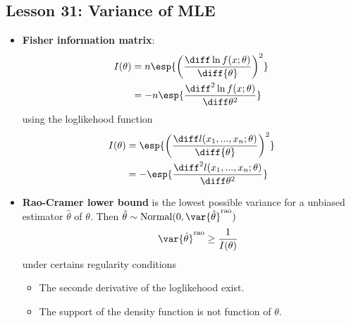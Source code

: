 \documentclass[10pt, french]{article}
\begin{document}
\begin{multicols*}{3}
\section*{Lesson 31: Variance of MLE}
\begin{itemize}[align=left,leftmargin=*]
    \item \textbf{Fisher information matrix}:
    \begin{align*}
        I(\theta) &= n \esp{\left( \frac{\diff \ln f(x;\theta)}{\diff{\theta}} \right)^2} \\
                  &= -n \esp{\frac{\diff^2 \ln f(x;\theta)}{\diff \theta^2}}
    \end{align*}
    using the loglikehood function
    \begin{align*}
        I(\theta) &= \esp{\left( \frac{\diff l(x_1,...,x_n;\theta)}{\diff{\theta}} \right)^2} \\
                  &= -\esp{\frac{\diff^2 l(x_1,...,x_n;\theta)}{\diff \theta^2}}
    \end{align*}
    \item \textbf{Rao-Cramer lower bound}\label{Def:rao-cramer bound} is the lowest possible variance for a unbiased estimator $\hat{\theta}$ of $\theta$. Then $\hat{\theta} \sim \mathrm{Normal(0, \var{\hat{\theta}}^{\textrm{rao}})}$
    \[\hspace*{0.5cm} \var{\hat{\theta}}^{\textrm{rao}} \geq \frac{1}{I(\theta)} \]
    under certains regularity conditions
    \begin{itemize}
        \item The seconde derivative of the loglikehood exist.
        \item The support of the density function is not function of $\theta$.
    \end{itemize}
\end{itemize}


\end{multicols*}
\end{document}
